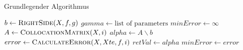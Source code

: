 \begin{algorithm}
\caption{Grundlegender Algorithmus}
\label{alg:Grund}
\begin{algorithmic}[1]

\State $b \gets \Call{RightSide}{X,f,g}$
\State $gamma \gets \text{list of parameters}$
\State $minError \gets \infty$
	\State $A \gets \Call{CollocationMatrix}{X, i}$
	\State $alpha \gets A\backslash b$
	\State $error \gets \Call{CalculateError}{X, Xte, f, i}$
		\State $retVal \gets alpha$
		\State $minError \gets error$
	\EndIf
\EndFor
\State {}
\EndFunction
\end{algorithmic}
\end{algorithm}